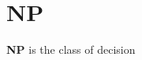 \section{NP}
\begin{frame}
	\begin{mydefinition}
	\textbf{NP} is the class of decision
	\end{mydefinition}
\end{frame}